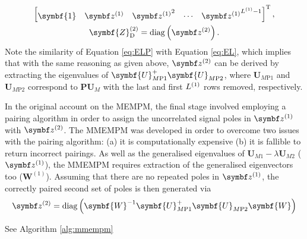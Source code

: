 {\begin{subequations}
\begin{gather}
\begin{bmatrix}
            \symbf{1} &
            \bdzone &
            {\bdzone}^2 &
            \cdots &
            {\bdzone}^{\Lone-1}
        \end{bmatrix}\T,\\
        \symbf{Z}^{(2)}_{\text{D}} = \diag \left( \bdztwo \right).
    \end{gather}
\end{subequations}
Note the similarity of Equation \ref{eq:ELP} with Equation \ref{eq:EL}, which
implies that with the same reasoning as given above, $\bdztwo$ can be derived
by extracting the eigenvalues of $\symbf{U}_{M\text{P}1}^+
\symbf{U}_{M\text{P}2}^{\vphantom{+}}$, where $\symbf{U}_{M\text{P}1}$ and
$\symbf{U}_{M\text{P}2}$ correspond to $\symbf{P} \symbf{U}_M$
with the last and first $L^{(1)}$ rows removed, respectively.

In the original account on the \ac{MEMPM}, the final stage involved employing a
pairing algorithm in order to assign the uncorrelated signal poles in $\bdzone$
with $\bdztwo$\cite{Hua1992}. The \ac{MMEMPM} was developed in order to
overcome two issues with the pairing algorithm: (a) it is computationally
expensive (b) it is fallible to return incorrect pairings\cite{Chen2007}.
As well as the generalised eigenvalues of $\symbf{U}_{M1} - \lambda
\symbf{U}_{M2}$ ($\bdzone$), the \ac{MMEMPM} requires extraction of the
generalised eigenvectors too ($\symbf{W}^{(1)}$). Assuming that there are no
repeated poles in $\bdzone$, the correctly paired second set of poles is then
generated via
\begin{equation}
    \bdztwo = \diag\left(
        \symbf{W}^{-1}
        \symbf{U}_{M\text{P}1}^+
        \symbf{U}_{M\text{P}2}^{\vphantom{+}}
        \symbf{W}
    \right)
\end{equation}

See Algorithm \ref{alg:mmempm}

}
